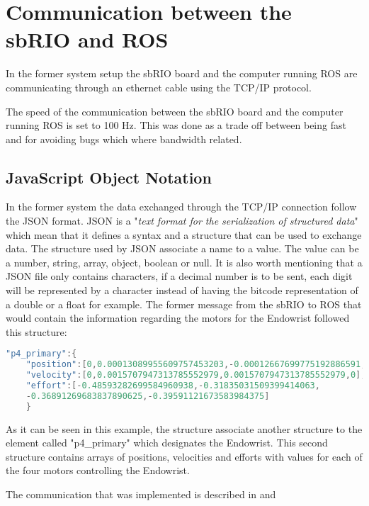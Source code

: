 \section{Communication between the sbRIO and ROS}\label{sec:com_ROS_sbRIO}


In the former system setup the sbRIO board and the computer running ROS are communicating through an ethernet cable using the TCP/IP protocol.

The speed of the communication between the sbRIO board and the computer running ROS is set to 100 Hz. This was done as a trade off between being fast and for avoiding bugs which where bandwidth related\cite{Chris_Surgical}.

\subsection*{JavaScript Object Notation}\label{subsec:JSON}
In the former system the data exchanged through the TCP/IP connection follow the \gls{JSON} format. \gls{JSON} is a "\textit{text format for the serialization of structured data}"\cite{JSON_IETF} which mean that it defines a syntax and a structure that can be used to exchange data. The structure used by \gls{JSON} associate a name to a value. The value can be a number, string, array, object, boolean or null. It is also worth mentioning that a \gls{JSON} file only contains characters, if a decimal number is to be sent, each digit will be represented by a character instead of having the bitcode representation of a double or a float for example. The former message from the sbRIO to ROS that would contain the information regarding the motors for the Endowrist followed this structure:

\begin{lstlisting}[language=C]
"p4_primary":{
	"position":[0,0.00013089955609757453203,-0.00012667699775192886591,0],
	"velocity":[0,0.0015707947313785552979,0.0015707947313785552979,0],
	"effort":[-0.48593282699584960938,-0.31835031509399414063,
	-0.36891269683837890625,-0.39591121673583984375]
	}
\end{lstlisting}

As it can be seen in this example, the structure associate another structure to the element called "p4\_primary" which designates the Endowrist. This second structure contains arrays of positions, velocities and efforts with values for each of the four motors controlling the Endowrist.

The communication that was implemented is described in  and 